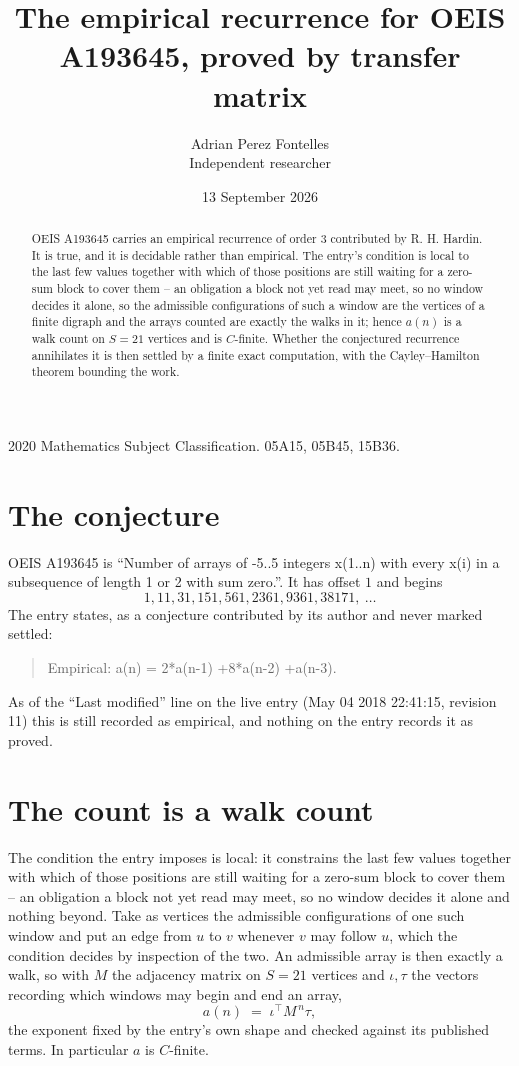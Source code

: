 \documentclass[11pt,a4paper]{article}
\title{The empirical recurrence for OEIS A193645, proved by transfer matrix}
\author{Adrian Perez Fontelles\\ \small Independent researcher}
\date{13 September 2026}
\theoremstyle{plain}
\theoremstyle{definition}
\begin{document}
\maketitle

\begin{abstract}
OEIS A193645 carries an empirical recurrence of order $3$ contributed by R. H. Hardin. It is
true, and it is decidable rather than empirical. The entry's condition is local to the last few values together with which of those positions are still waiting for a zero-sum block to cover them -- an obligation a block not yet read may meet, so no window decides it alone, so
the admissible configurations of such a window are the vertices of a finite digraph and the
arrays counted are exactly the walks in it; hence $a(n)$ is a walk count on $S=21$ vertices
and is $C$-finite. Whether the conjectured recurrence annihilates it is then settled by a
finite exact computation, with the Cayley--Hamilton theorem bounding the work.
\end{abstract}

\noindent\small 2020 Mathematics Subject Classification. 05A15, 05B45, 15B36.\normalsize

\section{The conjecture}

OEIS A193645 is ``Number of arrays of -5..5 integers x(1..n) with every x(i) in a subsequence of length 1 or 2 with sum zero.''. It has offset $1$ and begins
\[
1, 11, 31, 151, 561, 2361, 9361, 38171,\ \dots
\]
The entry states, as a conjecture contributed by its author and never marked settled:
\begin{quote}
Empirical: a(n) = 2*a(n-1) +8*a(n-2) +a(n-3).
\end{quote}
As of the ``Last modified'' line on the live entry (May 04 2018 22:41:15, revision 11) this is still
recorded as empirical, and nothing on the entry records it as proved.

\section{The count is a walk count}

The condition the entry imposes is local: it constrains the last few values together with which of those positions are still waiting for a zero-sum block to cover them -- an obligation a block not yet read may meet, so no window decides it alone and nothing beyond. Take as
vertices the admissible configurations of one such window and put an edge from $u$ to $v$
whenever $v$ may follow $u$, which the condition decides by inspection of the two. An
admissible array is then exactly a walk, so with $M$ the adjacency matrix on $S=21$ vertices
and $\iota,\tau$ the vectors recording which windows may begin and end an array,
\[
a(n)\;=\;\iota^{\!\top}M^{\,n}\tau ,
\]
the exponent fixed by the entry's own shape and checked against its published terms. In
particular $a$ is $C$-finite.
\end{document}
